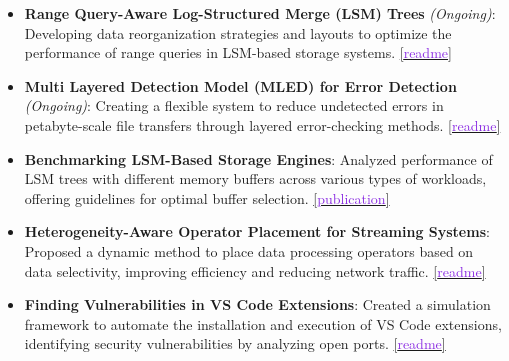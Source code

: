 \begin{itemize}\setlength\itemsep{0.4em}
	\item \textbf{Range Query-Aware Log-Structured Merge (LSM) Trees} \textit{(Ongoing)}: Developing data reorganization strategies and layouts to optimize the performance of range queries in LSM-based storage systems.
	      \href{https://github.com/shubham-sudo/LSMQueryDrivenCompaction}{[\textcolor{blueviolet}{readme}]}

	\item \textbf{Multi Layered Detection Model (MLED) for Error Detection} \textit{(Ongoing)}: Creating a flexible system to reduce undetected errors in petabyte-scale file transfers through layered error-checking methods.
	      \href{https://github.com/shubham-sudo/mled}{[\textcolor{blueviolet}{readme}]}

	\item \textbf{Benchmarking LSM-Based Storage Engines}: Analyzed performance of LSM trees with different memory buffers across various types of workloads, offering guidelines for optimal buffer selection.
	      \href{https://shubhamkaushik.com/assets/pdf/LSMMemory.pdf}{[\textcolor{blueviolet}{publication}]}

	\item \textbf{Heterogeneity-Aware Operator Placement for Streaming Systems}: Proposed a dynamic method to place data processing operators based on data selectivity, improving efficiency and reducing network traffic.
	      \href{https://github.com/shubham-sudo/HeterogeneityAwareOperatorPlacementforStreamProcessingSystemsAtEdge-RaspberryPi}{[\textcolor{blueviolet}{readme}]}

	\item \textbf{Finding Vulnerabilities in VS Code Extensions}: Created a simulation framework to automate the installation and execution of VS Code extensions, identifying security vulnerabilities by analyzing open ports.
	      \href{https://github.com/prateekdceit06/VSCode-Extensions-Simulator}{[\textcolor{blueviolet}{readme}]}
\end{itemize}